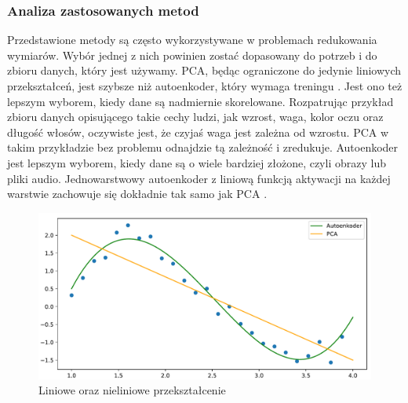 \documentclass[a4paper,12pt,oneside]{book} %
\begin{document}
\subsubsection{Analiza zastosowanych metod}
Przedstawione metody są często wykorzystywane w problemach redukowania wymiarów. Wybór jednej z nich powinien zostać dopasowany do potrzeb i do zbioru danych, który jest używamy. PCA, będąc ograniczone do jedynie liniowych przekształceń, jest szybsze niż autoenkoder, który wymaga treningu \cite{aevspca2}. Jest ono też lepszym wyborem, kiedy dane są nadmiernie skorelowane. Rozpatrując przykład zbioru danych opisującego takie cechy ludzi, jak wzrost, waga, kolor oczu oraz długość włosów, oczywiste jest, że czyjaś waga jest zależna od wzrostu. PCA w takim przykładzie bez problemu odnajdzie tą zależność i zredukuje. Autoenkoder jest lepszym wyborem, kiedy dane są o wiele bardziej złożone, czyli obrazy lub pliki audio.  
Jednowarstwowy autoenkoder z liniową funkcją aktywacji na każdej warstwie zachowuje się dokładnie tak samo jak PCA \cite{aevspca}.
\begin{figure}[h!]
	\centering
	\includegraphics[width=14cm]{pcavsautoencoder.pdf}
	\caption{Liniowe oraz nieliniowe przekształcenie}
	\label{fig:pcavsautoenkoder}
\end{figure}
\end{document}
